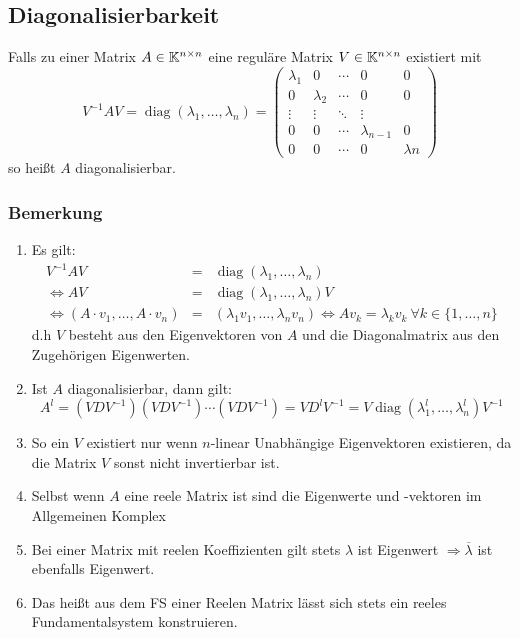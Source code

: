 \subsection{Diagonalisierbarkeit}
Falls zu einer Matrix $A \in \mathbb{K}^{n \times n}$ eine reguläre Matrix $V \in \mathbb{K}^{n \times n}$ existiert mit
\begin{equation*}
	V^{-1} A V = \operatorname{diag}(\lambda_1, \ldots, \lambda_n) = 
	\begin{pmatrix}
		\lambda_1 & 0 & \cdots & 0 & 0 \\
		0 & \lambda_2 & \cdots & 0 & 0 \\
		\vdots & \vdots & \ddots & \vdots \\
		0 & 0 & \cdots & \lambda_{n-1} & 0\\
		0 & 0 & \cdots & 0 & \lambda{n}
	\end{pmatrix}
\end{equation*}
so heißt $A$ diagonalisierbar.

\subsubsection{Bemerkung}
\begin{enumerate}[label= (\alph*)]
	\item Es gilt:
		\begin{eqnarray*}
			V^{-1} A V &=& \operatorname{diag}(\lambda_1, \ldots, \lambda_n)\\
			\Leftrightarrow A V &=& \operatorname{diag}(\lambda_1, \ldots, \lambda_n) V \\
			\Leftrightarrow (A  \cdot v_1, \ldots, A \cdot v_n) &=& (\lambda_1 v_1, \ldots, \lambda_n v_n)
			\Leftrightarrow A v_k = \lambda_k v_k\ \forall k \in \{1, \ldots, n\}
		\end{eqnarray*}
		d.h $V$ besteht aus den Eigenvektoren von $A$ und die Diagonalmatrix aus den Zugehörigen Eigenwerten.
	\item Ist $A$ diagonalisierbar, dann gilt:
		\begin{equation*}
			A^l = (V D V^{-1}) (V D V^{-1}) \cdots (V D V^{-1}) = V D^l V^{-1} = V 
			\operatorname{diag}(\lambda_1^l, \ldots, \lambda_n^l) V^{-1}
		\end{equation*}
	\item So ein $V$ existiert nur wenn $n$-linear Unabhängige Eigenvektoren existieren, da die Matrix $V$ sonst nicht
		invertierbar ist.
	\item Selbst wenn $A$ eine reele Matrix ist sind die Eigenwerte und -vektoren im Allgemeinen Komplex
	\item Bei einer Matrix mit reelen Koeffizienten gilt stets $\lambda$ ist Eigenwert $\Rightarrow \overline{\lambda}$
		ist ebenfalls Eigenwert.
	\item Das heißt aus dem FS einer Reelen Matrix lässt sich stets ein reeles Fundamentalsystem konstruieren.
\end{enumerate}

